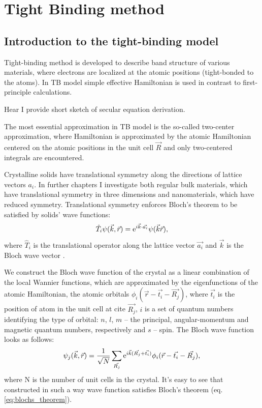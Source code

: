 \chapter{Tight Binding method}
\label{ch:theory}
\section{Introduction to the tight-binding model} \label{sec:TB_theory}
Tight-binding method is developed to describe band structure of various materials, where electrons are localized at the atomic positions (tight-bonded to the atoms). In TB model simple effective Hamiltonian is used in contrast to first-principle calculations. 

Hear I provide short sketch of secular equation derivation.

The most essential approximation in TB model is the so-called two-center approximation, where Hamiltonian is approximated by the atomic Hamiltonian centered on the atomic positions in the unit cell $\vec{R}$ and only two-centered integrals are encountered.

Crystalline solids have translational symmetry along the directions of lattice vectors $a_i$. In further chapters I investigate both regular bulk materials, which have translational symmetry in three dimensions and nanomaterials, which have reduced symmetry. Translational symmetry enforces Bloch's theorem to be satisfied by solids' wave functions:
\begin{equation} \label{eq:blochs_theorem}
	\hat{T}_i \psi(\vec{k},\vec{r}) = \mathrm{e}^{i \vec{k} \cdot \vec{a_i}} \psi(\vec{k}\vec{r}),
\end{equation}
where $\hat{T}_i$ is the translational operator along the lattice vector $\vec{a_i}$ and $\vec{k}$ is the Bloch wave vector \cite{kittel}.

We construct the Bloch wave function of the crystal as a linear combination of the local Wannier functions, which are approximated by the eigenfunctions of the atomic Hamiltonian, the atomic orbitals $\phi_{i}(\vec{r} - \vec{t_i} - \vec{R_j})$, where $\vec{t_i}$ is the position of atom in the unit cell at cite $\vec{R_j}$, $i$ is a set of quantum numbers identifying the type of orbital: $n$, $l$, $m$ -- the principal, angular-momentum and magnetic quantum numbers, respectively and $s$ -- spin. The Bloch wave function looks as follows:
\begin{equation} \label{eq:wave_fun}
	\psi_{j}(\vec{k},\vec{r}) = \frac{1}{\sqrt{N}} \sum_{\vec{R_j}} \mathrm{e}^{i\vec{k}(\vec{R_j} + \vec{t_i})} \phi_{i} (\vec{r} - \vec{t_i} - \vec{R_j}),
\end{equation}
where N is the number of unit cells in the crystal. It's easy to see that constructed in such a way wave function satisfies Bloch's theorem (eq. \ref{eq:blochs_theorem}).

